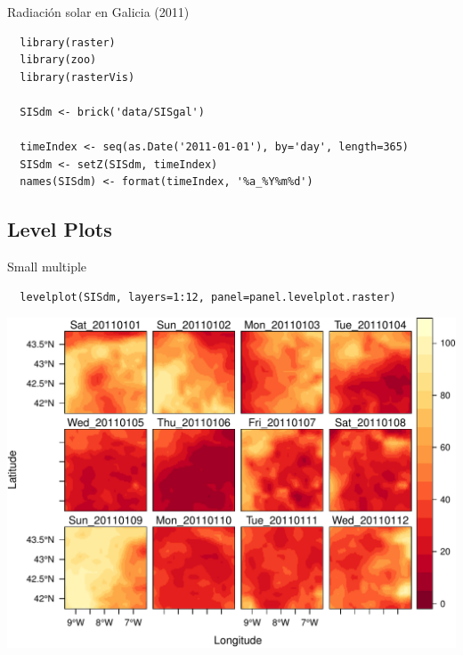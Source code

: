 \documentclass[xcolor={usenames,svgnames,dvipsnames}]{beamer}
\begin{document}
\begin{frame}[fragile,label=sec-4-1-1]{Radiación solar en Galicia (2011)}
 \lstset{language=R,label= ,caption= ,numbers=none}
\begin{lstlisting}
  library(raster)
  library(zoo)
  library(rasterVis)
  
  SISdm <- brick('data/SISgal')
  
  timeIndex <- seq(as.Date('2011-01-01'), by='day', length=365)
  SISdm <- setZ(SISdm, timeIndex)
  names(SISdm) <- format(timeIndex, '%a_%Y%m%d')
\end{lstlisting}
\end{frame}


\subsection{Level Plots}
\label{sec-4-2}

\begin{frame}[fragile,label=sec-4-2-1]{Small multiple}
 \lstset{language=R,label= ,caption= ,numbers=none}
\begin{lstlisting}
  levelplot(SISdm, layers=1:12, panel=panel.levelplot.raster)
\end{lstlisting}


\includegraphics[width=.9\linewidth]{figs/SISdm.pdf}
\end{frame}
\end{document}
